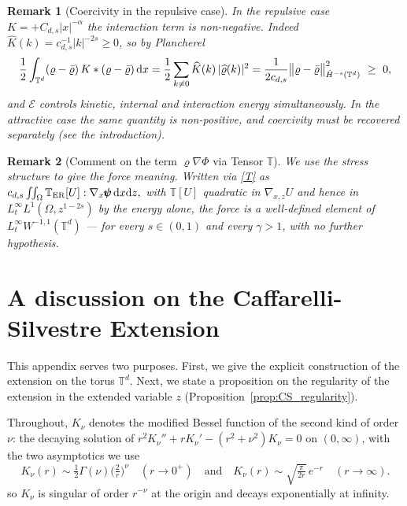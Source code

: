 \documentclass[12pt,a4paper,twoside]{article}
\newcommand{\vr}{\varrho}
\newcommand{\Grad}{\nabla}
\newcommand{\dx}{{\,\rm d} {x}}
\newtheorem{rmk}{Remark}
\numberwithin{equation}{section}%
\newcommand{\T}{\mathbb{T}}
\newcommand{\dz}{{\rm d} z}
\begin{document}
\begin{rmk}[Coercivity in the repulsive case]\label{rem:K-coercive}
	In the repulsive case $K=+C_{d,s}|x|^{-\alpha}$ the interaction term is non-negative. Indeed $\widehat K(k)=c_{d,s}^{-1}|k|^{-2s}\ge0$, so by Plancherel
	\begin{equation}\label{K-post}
		\frac12\int_{\mathbb T^d}(\vr-\bar\vr)\,K\ast(\vr-\bar\vr) \dx
		= \frac12\sum_{k\neq0}\widehat K(k)\,|\widehat\vr(k)|^2
		= \frac{1}{2c_{d,s}}\big\|\vr-\bar\vr\big\|_{\dot H^{-s}(\mathbb T^d)}^2 \ \ge\ 0,
	\end{equation}
	and $\mathcal E$ controls kinetic, internal and interaction energy simultaneously. In the attractive case the same quantity is non-positive, and coercivity must be recovered separately (see the introduction).
\end{rmk}
\begin{rmk}[Comment on the term $ \vr \Grad \Phi$ via Tensor $   \T $] \label{rem:stress-meaning}
	We use the stress structure to give the force meaning. Written via \eqref{T} as $ c_{d,s}\iint_\Omega\mathbb T_{\rm ER}[U]:\Grad_x\pmb{\psi} \dx \dz ,$ with $\mathbb T[U]$ quadratic in $\Grad_{x,z}U$ and hence in $L^\infty_tL^1(\Omega,z^{1-2s})$ by the energy alone, the force is a well-defined element of $L^\infty_tW^{-1,1}(\mathbb T^d)$ --- for every $s\in(0,1)$ and every $\gamma>1$, with no further hypothesis.
\end{rmk}

	
	
	
	
\section{A discussion on the Caffarelli-Silvestre Extension}	\label{sec:extension-appendix}

This appendix serves two purposes. First, we give the explicit construction of
the extension on the torus $\mathbb{T}^d$. Next, we state a proposition on the
regularity of the extension in the extended variable $z$
(Proposition~\ref{prop:CS_regularity}).

Throughout, $K_\nu$ denotes the modified Bessel function of the second kind of order $\nu$: the
decaying solution of $r^2 K_\nu''+r K_\nu'-(r^2+\nu^2)K_\nu=0$ on $(0,\infty)$, with the two
asymptotics we use
\begin{equation}\label{eq:bessel-asymp}
	K_\nu(r)\sim \tfrac12\Gamma(\nu)\big(\tfrac{2}{r}\big)^{\nu}\quad(r\to0^+)
	\quad \text{and} \quad
	K_\nu(r)\sim \sqrt{\tfrac{\pi}{2r}}\,e^{-r}\quad(r\to\infty).
\end{equation}
so $K_\nu$ is singular of order $r^{-\nu}$ at the origin and decays exponentially at infinity.
\end{document}
